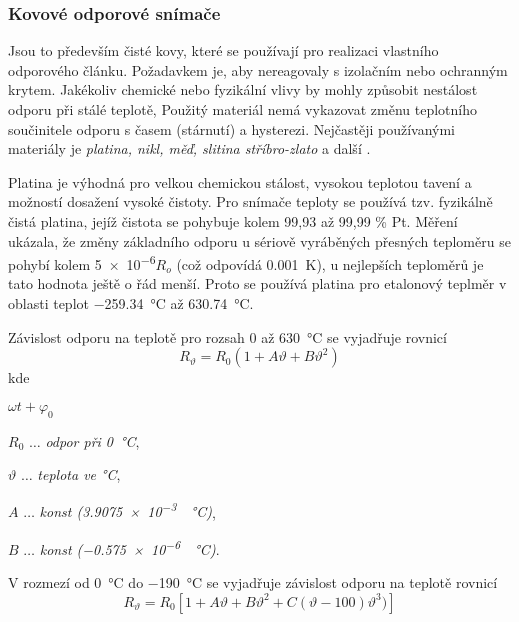           \subsubsection{Kovové odporové snímače} 
            Jsou to především čisté kovy, které se používají pro realizaci vlastního odporového
            článku. Požadavkem je, aby nereagovaly s izolačním nebo ochranným krytem. Jakékoliv
            chemické nebo fyzikální vlivy by mohly způsobit nestálost odporu při stálé teplotě,
            Použitý materiál nemá vykazovat změnu teplotního součinitele odporu s časem (stárnutí)
            a hysterezi. Nejčastěji používanými materiály je \emph{platina, nikl, měď, slitina
            stříbro-zlato} a další \cite[s.~96]{Zehnula1983}.
             
            Platina je výhodná pro velkou chemickou stálost, vysokou teplotou tavení a možností
            dosažení vysoké čistoty. Pro snímače teploty se používá tzv. fyzikálně  čistá platina,
            jejíž čistota se pohybuje kolem 99,93 až 99,99 \% Pt. Měření ukázala, že změny
            základního odporu u sériově vyráběných přesných teploměru se pohybí kolem
            \num{5e-6}$R_o$ (což odpovídá \SI{0.001}{\kelvin}), u nejlepších teploměrů je tato
            hodnota ještě o řád menší. Proto se používá platina pro etalonový teplměr v oblasti
            teplot \SI{-259.34}{\degreeCelsius} až \SI{630.74}{\degreeCelsius}.
            
            Závislost odporu na teplotě pro rozsah \num{0} až \SI{630}{\degreeCelsius} se vyjadřuje
            rovnicí
            \begin{equation}\label{SAC:kov_Ro1}
              R_\vartheta = R_0(1 + A\vartheta + B\vartheta^2)
            \end{equation}
            kde 
            \begin{labeling}{$\omega t+\varphi_0$}
              \setlength{\itemindent}{2cm}
              \item[\(R_0\)]          \(\ldots\) \emph{odpor při \SI{0}{\degreeCelsius}}, 
              \item[\(\vartheta\)]    \(\ldots\) \emph{teplota ve \si{\degreeCelsius}}, 
              \item[\(A\)]            \(\ldots\) \emph{konst (\SI{3.9075e-3}{\per\degreeCelsius})},
              \item[\(B\)]            \(\ldots\) \emph{konst (\SI{-0.575e-6}{\per\degreeCelsius})}. 
            \end{labeling}
 
             V rozmezí od \SI{0}{\degreeCelsius} do \SI{-190}{\degreeCelsius} se vyjadřuje
             závislost odporu na teplotě rovnicí
             \begin{equation}\label{SAC:kov_Ro2}
               R_\vartheta = R_0[1 + A\vartheta + B\vartheta^2 + C(\vartheta - 100)\vartheta^3)]
             \end{equation}

